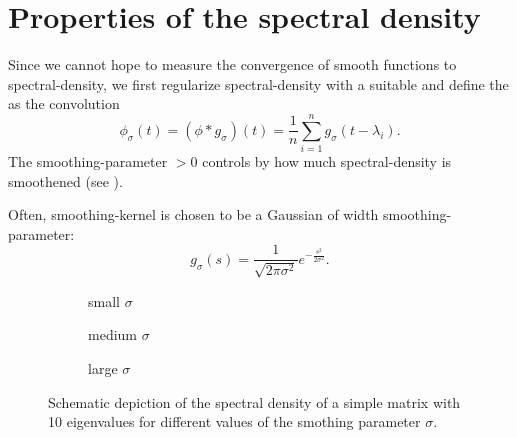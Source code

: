 
\section{Properties of the spectral density}
\label{sec:1-introduction-properties}

Since we cannot hope to measure the convergence of smooth functions to \gls{spectral-density},
we first regularize \gls{spectral-density} with a suitable  \cite{epanechnikov1969kernel}
and define the  as the convolution
\begin{equation}
    \phi_{\sigma}(t) = (\phi \ast g_{\sigma})(t) = \frac{1}{n} \sum_{i=1}^{n} g_{\sigma}(t - \lambda_i).
    \label{equ:1-introduction-def-smooth-spectral-density}
\end{equation}
The \gls{smoothing-parameter} $>0$ controls by how much \gls{spectral-density} is
smoothened (see ).

Often, \gls{smoothing-kernel} is chosen to be a Gaussian of width \gls{smoothing-parameter}:
\begin{equation}
    g_{\sigma}(s) = \frac{1}{\sqrt{2 \pi \sigma^2}} e^{-\frac{s^2}{2\sigma^2}}.
    \label{equ:1-introduction-def-gaussian-kernel}
\end{equation}

\begin{figure}[ht]
    \begin{subfigure}[b]{0.33\columnwidth}
        
        \caption{small $\sigma$}
        \label{fig:1-introduction-spectral-density-example-0.01}
    \end{subfigure}
    \begin{subfigure}[b]{0.33\columnwidth}
        
        \caption{medium $\sigma$}
        \label{fig:1-introduction-spectral-density-example-0.02}
    \end{subfigure}
    \begin{subfigure}[b]{0.33\columnwidth}
        
        \caption{large $\sigma$}
        \label{fig:1-introduction-spectral-density-example-0.05}
    \end{subfigure}
    \caption{Schematic depiction of the spectral density of a simple matrix with
    10 eigenvalues for different values of the smothing parameter $\sigma$.}
    \label{fig:1-introduction-smoothened-spectral-density}
\end{figure}

